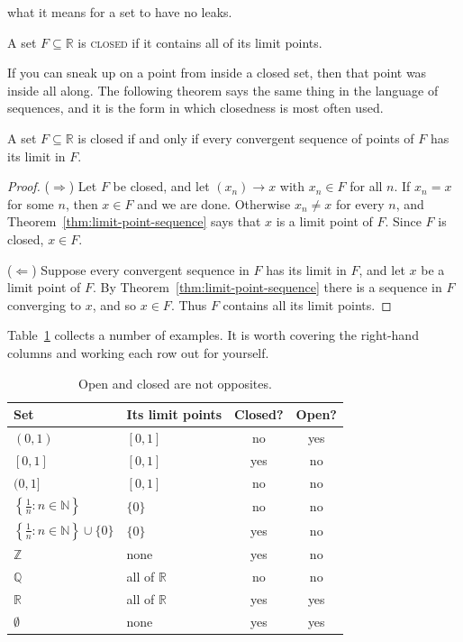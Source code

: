  what it means for a set to have no leaks.

\begin{definition}\label{def:closed}
A set $F \subseteq \mathbb{R}$ is \textsc{closed} if it contains all of its limit points.
\end{definition}

If you can sneak up on a point from inside a closed set, then that point was inside all along.  The following theorem says the same thing in the language of sequences, and it is the form in which closedness is most often used.

\begin{theorem}\label{thm:closed-sequences}
A set $F \subseteq \mathbb{R}$ is closed if and only if every convergent sequence of points of $F$ has its limit in $F$.
\end{theorem}

\begin{proof}
($\Rightarrow$)  Let $F$ be closed, and let $(x_n) \to x$ with $x_n \in F$ for all $n$.  If $x_n = x$ for some $n$, then $x \in F$ and we are done.  Otherwise $x_n \neq x$ for every $n$, and Theorem~\ref{thm:limit-point-sequence} says that $x$ is a limit point of $F$.  Since $F$ is closed, $x \in F$.

($\Leftarrow$)  Suppose every convergent sequence in $F$ has its limit in $F$, and let $x$ be a limit point of $F$.  By Theorem~\ref{thm:limit-point-sequence} there is a sequence in $F$ converging to $x$, and so $x \in F$.  Thus $F$ contains all its limit points.
\end{proof}


Table~\ref{tab:open-closed} collects a number of examples.  It is worth covering the right-hand columns and working each row out for yourself.

\begin{table}
\centering
\begin{tabular}{llcc}
\toprule
Set & Its limit points & Closed? & Open? \\
\midrule
$(0,1)$ & $[0,1]$ & no & yes \\
$[0,1]$ & $[0,1]$ & yes & no \\
$(0,1]$ & $[0,1]$ & no & no \\
$\left\{\frac1n : n \in \mathbb{N}\right\}$ & $\{0\}$ & no & no \\
$\left\{\frac1n : n \in \mathbb{N}\right\} \cup \{0\}$ & $\{0\}$ & yes & no \\
$\mathbb{Z}$ & none & yes & no \\
$\mathbb{Q}$ & all of $\mathbb{R}$ & no & no \\
$\mathbb{R}$ & all of $\mathbb{R}$ & yes & yes \\
$\emptyset$ & none & yes & yes \\
\bottomrule
\end{tabular}
\caption{Open and closed are not opposites.}
\label{tab:open-closed}
\end{table}

